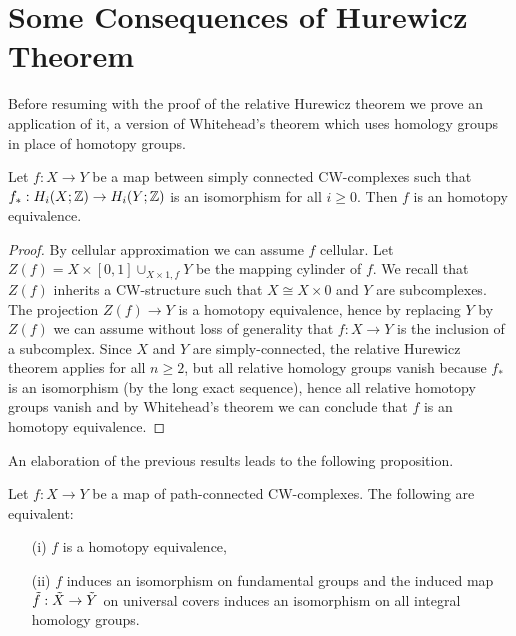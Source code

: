 
\section{Some Consequences of Hurewicz Theorem}


Before resuming with the proof of the relative Hurewicz theorem we prove an application of it, a version of Whitehead's theorem which uses homology groups in place of homotopy groups.

\begin{theorem}\label{theorem:homology-whitehead}
Let $f:X\to Y$ be a map between simply connected CW-complexes such that $f_*:H_i(X;{\mathbb Z})\to H_i(Y;{\mathbb Z})$ is an isomorphism for all $i\geq 0$. Then $f$ is an homotopy equivalence.
\end{theorem}

\begin{proof}
By cellular approximation we can assume $f$ cellular. Let $Z(f)=X\times[0,1]\cup_{X\times1, f}Y$ be the mapping cylinder of $f$. We recall that $Z(f
)$ inherits a CW-structure such that $X\cong X\times0$ and $Y$ are subcomplexes. The projection $Z(f)\to Y$ is a homotopy equivalence, hence by replacing $Y$ by $Z(f)$ we can assume without loss of generality that $f:X\to Y$ is the inclusion of a subcomplex. Since $X$ and $Y$ are simply-connected, the relative Hurewicz theorem applies for all $n\geq2$, but all relative homology groups vanish because $f_*$ is an isomorphism (by the long exact sequence), hence all relative homotopy groups vanish and by Whitehead's theorem we can conclude that $f$ is an homotopy equivalence.
\end{proof}

An elaboration of the previous results leads to the following proposition.

\begin{proposition}
Let $f:X\to Y$ be a map of path-connected CW-complexes. The following are equivalent:
\begin{itemize}
    \item[(i)] $f$ is a homotopy equivalence,
    \item[(ii)] $f$ induces an isomorphism on fundamental groups and the induced map $\tilde{f}:\tilde{X}\to\tilde{Y}$ on universal covers induces an isomorphism on all integral homology groups.
\end{itemize}
\end{proposition}

